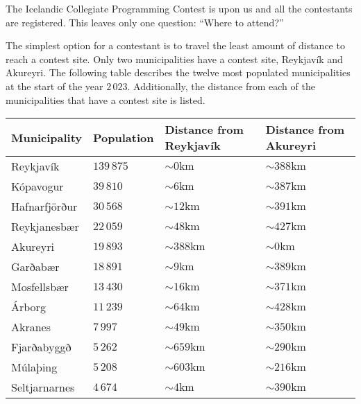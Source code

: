 
The Icelandic Collegiate Programming Contest is upon us and all the contestants are registered.
This leaves only one question: ``Where to attend?''

The simplest option for a contestant is to travel the least amount of distance to reach a contest site.
Only two municipalities have a contest site, Reykjavík and Akureyri.
The following table describes the twelve most populated municipalities at the start of the year $2\,023$.
Additionally, the distance from each of the municipalities that have a contest site is listed.

\begin{tabular}{|l|l|l|l|}
    \hline
    Municipality        & Population & Distance from Reykjavík & Distance from Akureyri \\ \hline
    Reykjavík           & $139\,875$ & $\sim   0 \mathrm{km}$  & $\sim 388 \mathrm{km}$ \\ \hline
    Kópavogur           &  $39\,810$ & $\sim   6 \mathrm{km}$  & $\sim 387 \mathrm{km}$ \\ \hline
    Hafnarfjörður       &  $30\,568$ & $\sim  12 \mathrm{km}$  & $\sim 391 \mathrm{km}$ \\ \hline
    Reykjanesbær        &  $22\,059$ & $\sim  48 \mathrm{km}$  & $\sim 427 \mathrm{km}$ \\ \hline
    Akureyri            &  $19\,893$ & $\sim 388 \mathrm{km}$  & $\sim   0 \mathrm{km}$ \\ \hline
    Garðabær            &  $18\,891$ & $\sim   9 \mathrm{km}$  & $\sim 389 \mathrm{km}$ \\ \hline
    Mosfellsbær         &  $13\,430$ & $\sim  16 \mathrm{km}$  & $\sim 371 \mathrm{km}$ \\ \hline
    Árborg              &  $11\,239$ & $\sim  64 \mathrm{km}$  & $\sim 428 \mathrm{km}$ \\ \hline
    Akranes             &   $7\,997$ & $\sim  49 \mathrm{km}$  & $\sim 350 \mathrm{km}$ \\ \hline
    Fjarðabyggð         &   $5\,262$ & $\sim 659 \mathrm{km}$  & $\sim 290 \mathrm{km}$ \\ \hline
    Múlaþing            &   $5\,208$ & $\sim 603 \mathrm{km}$  & $\sim 216 \mathrm{km}$ \\ \hline
    Seltjarnarnes       &   $4\,674$ & $\sim   4 \mathrm{km}$  & $\sim 390 \mathrm{km}$ \\ \hline
\end{tabular}

